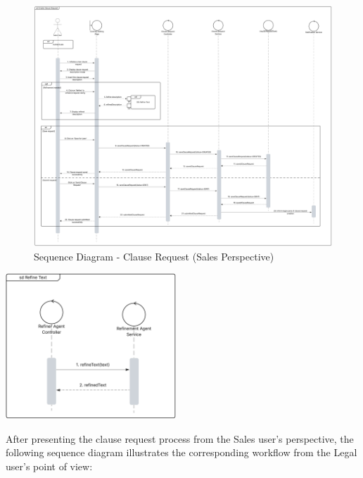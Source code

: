 \begin{landscape}
\begin{figure}[H]
    \centering
    \includegraphics[width=1.1\textwidth]{Images/Sequence Diagram - Sales - Clause Request.png}
    \caption{Sequence Diagram - Clause Request (Sales Perspective)}
    \label{fig:sequence_diagram_clause_request_sales}
\end{figure}
\end{landscape}

\begin{center}
    \centering
    \includegraphics[width=0.48\textwidth]{Images/Sequence Diagram - Refine Text Ref.png}
    \label{fig:sequence_diagram_refine_text}
\end{center}

After presenting the clause request process from the Sales user's perspective, the following sequence diagram illustrates the corresponding workflow from the Legal user's point of view:

